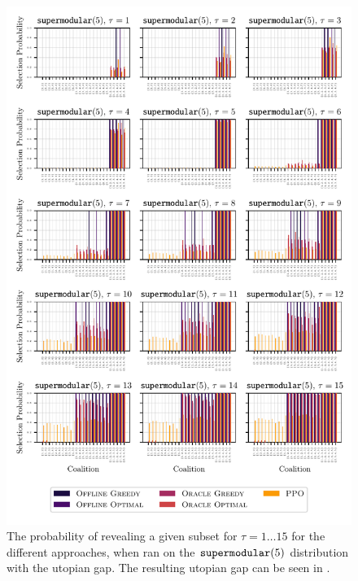\begin{figure}[t!]
  \centering
	\includegraphics[width=\textwidth]{figures/exploitability_convex5_coalition_bars.pdf}
	\caption{ The probability of revealing a given subset for $\tau=1\ldots 15$ for the different approaches, when ran on the $\supermodular[5]$ distribution with the utopian gap. 
		The resulting utopian gap can be seen in .
	}
\end{figure}

